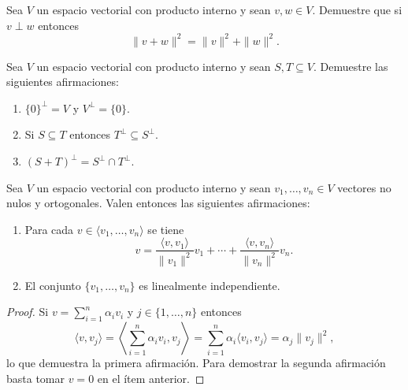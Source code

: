 \begin{xca}
	\label{xca:Pitagoras}
	Sea $V$ un espacio vectorial con producto interno y sean 
	$v,w\in V$. Demuestre que si $v\perp w$ entonces \[
		\|v+w\|^2=\|v\|^2+\|w\|^2. 
	\]
\end{xca}

\begin{xca}
    \label{xca:Sperp}
	Sea $V$ un espacio vectorial con producto interno y sean $S,T\subseteq V$.
	Demuestre las siguientes afirmaciones:
	\begin{enumerate}
		\item $\{0\}^\perp=V$ y $V^\perp=\{0\}$. 
		\item Si $S\subseteq T$ entonces $T^\perp\subseteq S^\perp$.
		\item $(S+T)^\perp=S^\perp\cap T^\perp$.
	\end{enumerate}
\end{xca}

\begin{prop}
    \label{pro:autoadjunto}
	Sea $V$ un espacio vectorial con producto interno y sean $v_1,\dots,v_n\in
	V$ vectores no nulos y ortogonales. Valen entonces las siguientes
	afirmaciones:
	\begin{enumerate}
		\item Para cada $v\in\langle v_1,\dots,v_n\rangle$ se tiene
			\[
			v=\frac{\langle v,v_1\rangle}{\|v_1\|^2} v_1+\cdots+\frac{\langle v,v_n\rangle}{\|v_n\|^2} v_n.  
			\]
		\item El conjunto $\{v_1,\dots,v_n\}$ es linealmente independiente.
	\end{enumerate}

	\begin{proof}
		Si $v=\sum_{i=1}^n\alpha_iv_i$ y $j\in\{1,\dots,n\}$ entonces \[
			\langle v,v_j\rangle=\left\langle\sum_{i=1}^n\alpha_iv_i,v_j\right\rangle=\sum_{i=1}^n\alpha_i\langle v_i,v_j\rangle=\alpha_j\|v_j\|^2,
		\]
		lo que demuestra la primera afirmación. Para demostrar la segunda
		afirmación basta tomar $v=0$ en el ítem anterior.
	\end{proof}
\end{prop}

